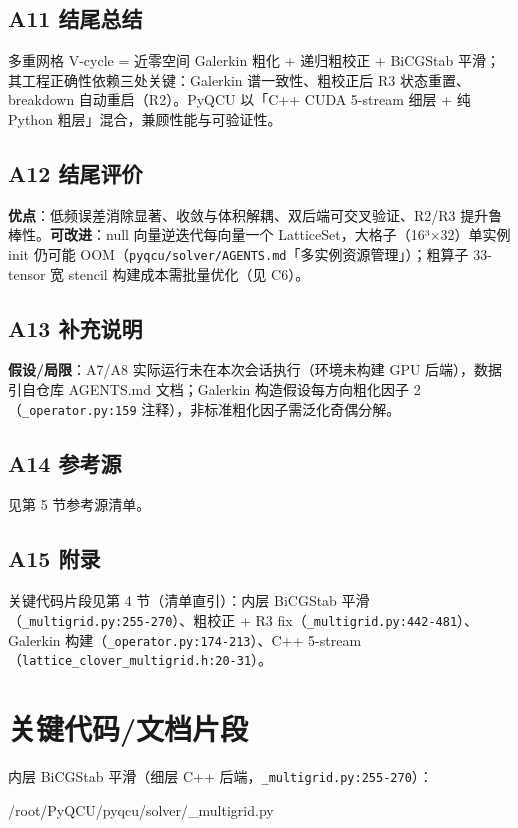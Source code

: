 \documentclass[UTF8]{ctexart}
\begin{document}
\subsection{A11 结尾总结}
\begin{conclbox}
多重网格 V-cycle = 近零空间 Galerkin 粗化 + 递归粗校正 + BiCGStab 平滑；其工程正确性依赖三处关键：Galerkin 谱一致性、粗校正后 R3 状态重置、breakdown 自动重启（R2）。PyQCU 以「C++ CUDA 5-stream 细层 + 纯 Python 粗层」混合，兼顾性能与可验证性。
\end{conclbox}

\subsection{A12 结尾评价}
\textbf{优点}：低频误差消除显著、收敛与体积解耦、双后端可交叉验证、R2/R3 提升鲁棒性。\textbf{可改进}：null 向量逆迭代每向量一个 LatticeSet，大格子（16³×32）单实例 init 仍可能 OOM（\texttt{pyqcu/solver/AGENTS.md}「多实例资源管理」）；粗算子 33-tensor 宽 stencil 构建成本需批量优化（见 C6）。

\subsection{A13 补充说明}
\textbf{假设/局限}：A7/A8 实际运行未在本次会话执行（环境未构建 GPU 后端），数据引自仓库 AGENTS.md 文档；Galerkin 构造假设每方向粗化因子 2（\texttt{\_operator.py:159} 注释），非标准粗化因子需泛化奇偶分解。

\subsection{A14 参考源}
见第 5 节参考源清单。

\subsection{A15 附录}
关键代码片段见第 4 节（清单直引）：内层 BiCGStab 平滑（\texttt{\_multigrid.py:255-270}）、粗校正 + R3 fix（\texttt{\_multigrid.py:442-481}）、Galerkin 构建（\texttt{\_operator.py:174-213}）、C++ 5-stream（\texttt{lattice\_clover\_multigrid.h:20-31}）。

\section{关键代码/文档片段}

内层 BiCGStab 平滑（细层 C++ 后端，\texttt{\_multigrid.py:255-270}）：

\begin{lstinputlisting}[firstline=255,lastline=270,language=python]{/root/PyQCU/pyqcu/solver/_multigrid.py}
\end{lstinputlisting}
\end{document}
